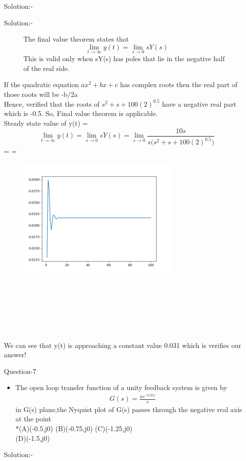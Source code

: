 \documentclass[journal,12pt,twocolumn]{IEEEtran}
\begin{document}
\begin{frame}{Solution:- }
\begin{frame}{Solution:- }
\begin{figure}[htp]
    The final value theorem states that  \[ \lim_{t \to \infty} y(t) = \lim_{s \to 0} sY(s)\]
\newline This is valid only when sY(s) has poles that lie in the negative half of the real side.
\end{figure}
 
  If the quadratic equation $ax^2 + bx + c$ has complex roots then the real part of those roots will be -b/2a
\\  
  Hence, verified that the roots of $s^2+ s + 100{(2)^{0.5}}$ have a negative real part which is -0.5. So, Final value theorem is applicable.
\\
 Steady state value of y(t) = \[ \lim_{t \to \infty} y(t) = \lim_{s \to 0} sY(s) = \lim_{s \to 0} \dfrac{10s}{s(s^2+ s + 100{(2)^{0.5})}} \]   
 \centering
 =  =  
\end{frame}
\begin{frame}{}
\begin{figure}
    \includegraphics[width=8cm]{./figs/shru1.png}
\end{figure}
\\\\\\\\\\\\
We can see that y(t) is approaching a constant value 0.031 which is verifies our answer!    
\end{frame} 

\begin{frame}{Question-7 }
\begin{itemize}
\item The open loop transfer function of a unity feedback system is given by
\begin{align*}
 G(s)=\frac{\pi e^{-0.25s}}{s}
\end{align*}
in G(s) plane,the Nyquist plot of G(s) passes through the negative real axis at the point
\\*(A)(-0.5,j0)  (B)(-0.75,j0)  (C)(-1.25,j0) \\ (D)(-1.5,j0)
\end{itemize}
\end{frame}
\begin{frame}{Solution:- }
\begin{itemize}



\end{itemize}
\end{frame}
\end{frame}
\end{document}

